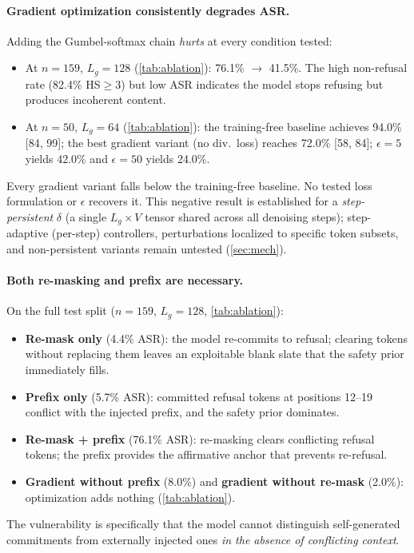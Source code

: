 \documentclass{article}
\theoremstyle{coloredthm}
\begin{document}
\paragraph{Gradient optimization consistently degrades ASR.} Adding the Gumbel-softmax chain \textit{hurts} at every condition tested:
\begin{itemize}
    \item At $n{=}159$, $L_g{=}128$ (\cref{tab:ablation}): 76.1\% $\to$ 41.5\%. The high non-refusal rate (82.4\% HS$\geq$3) but low ASR indicates the model stops refusing but produces incoherent content.
    \item At $n{=}50$, $L_g{=}64$ (\cref{tab:ablation}): the training-free baseline achieves 94.0\% [84, 99]; the best gradient variant (no div.\ loss) reaches 72.0\% [58, 84]; $\epsilon{=}5$ yields 42.0\% and $\epsilon{=}50$ yields 24.0\%.
\end{itemize}
Every gradient variant falls below the training-free baseline. No tested loss formulation or $\epsilon$ recovers it. This negative result is established for a \textit{step-persistent} $\delta$ (a single $L_g \times V$ tensor shared across all denoising steps); step-adaptive (per-step) controllers, perturbations localized to specific token subsets, and non-persistent variants remain untested (\cref{sec:mech}).

\paragraph{Both re-masking and prefix are necessary.} On the full test split ($n{=}159$, $L_g{=}128$, \cref{tab:ablation}):
\begin{itemize}
    \item \textbf{Re-mask only} (4.4\% ASR): the model re-commits to refusal; clearing tokens without replacing them leaves an exploitable blank slate that the safety prior immediately fills.
    \item \textbf{Prefix only} (5.7\% ASR): committed refusal tokens at positions 12--19 conflict with the injected prefix, and the safety prior dominates.
    \item \textbf{Re-mask + prefix} (76.1\% ASR): re-masking clears conflicting refusal tokens; the prefix provides the affirmative anchor that prevents re-refusal.
    \item \textbf{Gradient without prefix} (8.0\%) and \textbf{gradient without re-mask} (2.0\%): optimization adds nothing (\cref{tab:ablation}).
\end{itemize}
The vulnerability is specifically that the model cannot distinguish self-generated commitments from externally injected ones \textit{in the absence of conflicting context}.
\end{document}
